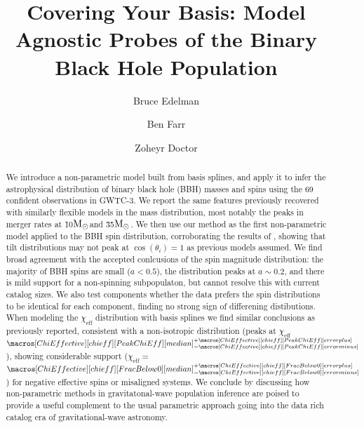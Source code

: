 \documentclass[twocolumn, linenumbers]{aastex631}
\newcommand{\msun}{\ensuremath{{\rm M}_\odot}}
\newcommand{\result}[1]{\textcolor{red}{#1}}
\newcommand{\CIPlusMinus}[1]{{#1[median]^{+#1[error plus]}_{-#1[error minus]}}}
\begin{document}
\title{Covering Your Basis: Model Agnostic Probes of the Binary Black Hole Population}

\author{Bruce Edelman}

\author{Ben Farr}

\author{Zoheyr Doctor}




\begin{abstract}                 
We introduce a non-parametric model built from basis splines, and apply it to infer the astrophysical distribution of 
binary black hole (BBH) masses and spins using the 69 confident observations in GWTC-3. We report the same features previously recovered 
with similarly flexible models in the mass distribution, most notably the peaks in merger rates at \~10\msun and \~35\msun. 
We then use our method as the first non-parametric model applied to the BBH spin distribution, corroborating the results of \citet{spinitasyoulike}, 
showing that tilt distributions may not peak at $\cos(\theta_i) = 1$ as previous models assumed. We find broad agreement with the 
accepted conlcusions of the spin magnitude distribution: the majority of BBH spins are small ($a<0.5$), the distribution peaks at $a\sim0.2$, 
and there is mild support for a non-spinning subpopulaton, but cannot resolve this with current catalog sizes. We also test components whether the data 
prefers the spin distributions to be identical for each component, finding no strong sign of differening distibutions. When modeling the $\chi_\mathrm{eff}$ 
distribution with basis splines we find similar conclusions as previously reported, consistent with a non-isotropic distribution 
(peaks at $\chi_\mathrm{eff}$\result{$\CIPlusMinus{\macros[ChiEffective][chieff][PeakChiEff]}$}), showing considerable support 
($\chi_\mathrm{eff}=$\result{$\CIPlusMinus{\macros[ChiEffective][chieff][FracBelow0]}$}) for negative effective spins or misaligned systems.
We conclude by discussing how non-parametric methods in gravitatonal-wave population inference are poised to provide a useful complement to 
the usual parametric approach going into the data rich catalog era of gravitational-wave astronomy.
\end{abstract}
\end{document}
